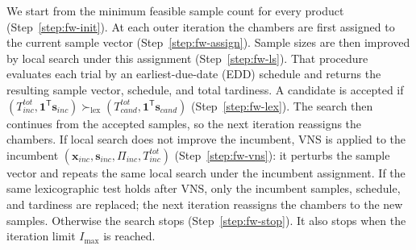 We start from the minimum feasible sample count for every product
(Step~\ref{step:fw-init}).
At each outer iteration the chambers are first assigned to the
current sample vector (Step~\ref{step:fw-assign}).
Sample sizes are then improved by local search under this assignment
(Step~\ref{step:fw-ls}).
That procedure evaluates each trial by an earliest-due-date (EDD)
schedule and returns the resulting sample vector, schedule, and total
tardiness.
A candidate is accepted if
\((T^{tot}_{inc},\mathbf{1}^{\mathsf{T}}\mathbf{s}_{inc})\succ_{\mathrm{lex}}(T^{tot}_{cand},\mathbf{1}^{\mathsf{T}}\mathbf{s}_{cand})\)
(Step~\ref{step:fw-lex}).
The search then continues from the accepted samples, so the next
iteration reassigns the chambers.
If local search does not improve the incumbent, VNS is applied to
the incumbent
\((\mathbf{x}_{inc},\mathbf{s}_{inc},\Pi_{inc},T^{tot}_{inc})\)
(Step~\ref{step:fw-vns}): it perturbs the sample vector and repeats
the same local search under the incumbent assignment.
If the same lexicographic test holds after VNS, only the incumbent
samples, schedule, and tardiness are replaced; the next iteration
reassigns the chambers to the new samples.
Otherwise the search stops (Step~\ref{step:fw-stop}).
It also stops when the iteration limit \(I_{\max}\) is reached.
